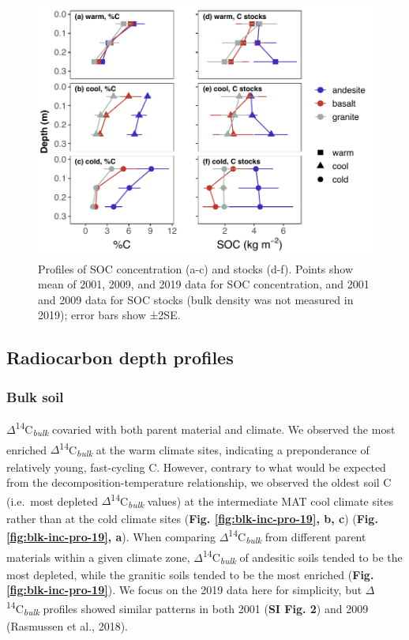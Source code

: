 \documentclass[english,man,floatsintext]{apa6}
\begin{document}
\begin{figure}

{\centering \includegraphics[width=0.65\linewidth,height=0.65\textheight]{sra-blk-inc-19_files/figure-latex/plot-C-profiles-1} 

}

\caption{Profiles of SOC concentration (a-c) and stocks (d-f). Points show mean of 2001, 2009, and 2019 data for SOC concentration, and 2001 and 2009 data for SOC stocks (bulk density was not measured in 2019); error bars show ±2SE.}\label{fig:plot-C-profiles}
\end{figure}

\hypertarget{radiocarbon-depth-profiles}{%
\subsection{Radiocarbon depth profiles}\label{radiocarbon-depth-profiles}}

\hypertarget{bulk-soil}{%
\subsubsection{Bulk soil}\label{bulk-soil}}

\(\Delta\)\textsuperscript{14}C\textsubscript{\emph{bulk}} covaried with both parent material and climate. We observed the most enriched \(\Delta\)\textsuperscript{14}C\textsubscript{\emph{bulk}} at the warm climate sites, indicating a preponderance of relatively young, fast-cycling C. However, contrary to what would be expected from the decomposition-temperature relationship, we observed the oldest soil C (i.e.~most depleted \(\Delta\)\textsuperscript{14}C\textsubscript{\emph{bulk}} values) at the intermediate MAT cool climate sites rather than at the cold climate sites (\textbf{Fig. \ref{fig:blk-inc-pro-19}, b, c}) (\textbf{Fig. \ref{fig:blk-inc-pro-19}, a}). When comparing \(\Delta\)\textsuperscript{14}C\textsubscript{\emph{bulk}} from different parent materials within a given climate zone, \(\Delta\)\textsuperscript{14}C\textsubscript{\emph{bulk}} of andesitic soils tended to be the most depleted, while the granitic soils tended to be the most enriched (\textbf{Fig. \ref{fig:blk-inc-pro-19}}). We focus on the 2019 data here for simplicity, but \(\Delta\)\textsuperscript{14}C\textsubscript{\emph{bulk}} profiles showed similar patterns in both 2001 (\textbf{SI Fig. 2}) and 2009 (Rasmussen et al., 2018).
\end{document}
